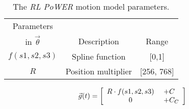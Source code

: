\begin{table}[h]
\begin{center}
\begin{tabular}{|c|c|c|}
\hline
Parameters        &                           &       \\
in $\vec{\theta}$ & Description               & Range \\
\hline
\hline
$f(s1,s2,s3)$        & Spline function           & [0,1] \\  %
\hline
$R$          & Position multiplier                & [256, 768] \\
\hline
\end{tabular}
\caption{The \emph{RL PoWER} motion model parameters.}
\end{center}
\end{table}


\[
\vec{g}(t) =
\left[ {\begin{array}{c@{ }c@{ }c@{ }l@{ }l}
R \cdot f(s1, s2, s3) & \ \          & \             & \            & + C \\ %
0                              & \             & \             & \            & + C_C \\ %
\end{array} } \right]
\]
